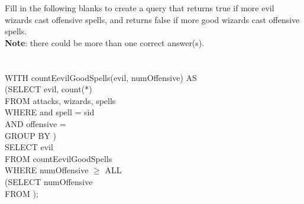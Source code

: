 \documentclass[10pt]{article}
\begin{document}
Fill in the following blanks to create a query that returns true if more evil wizards cast offensive spells, and returns false if more good wizards cast offensive spells.\\
\textbf{Note}: there could be more than one correct answer(s).\\
\\
\\
WITH countEevilGoodSpells(evil, numOffensive) AS\\
(SELECT  evil, count(*)\\
FROM  attacks, wizards, spells\\
WHERE  \underline{\quad{}\quad\quad} and spell = sid\\
AND offensive = \underline{\quad{}\quad\quad}\\
GROUP BY \underline{\quad{}\quad\quad})\\
SELECT evil\\
FROM countEevilGoodSpells\\
WHERE numOffensive $\ge$ ALL\\
(SELECT numOffensive\\
FROM \underline{\quad{}\quad\quad});\\
\\
\end{document}
